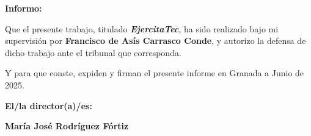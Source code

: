 \textbf{Informo:}

\vspace{0.5cm}

Que el presente trabajo, titulado \textit{\textbf{EjercitaTec}},
ha sido realizado bajo mi supervisión por \textbf{Francisco de Asís Carrasco Conde}, y autorizo la defensa de dicho trabajo ante el tribunal
que corresponda.

\vspace{0.5cm}

Y para que conste, expiden y firman el presente informe en Granada a Junio de 2025.

\vspace{1cm}

\textbf{El/la director(a)/es: }

\vspace{2cm}

\noindent \textbf{María José Rodríguez Fórtiz}